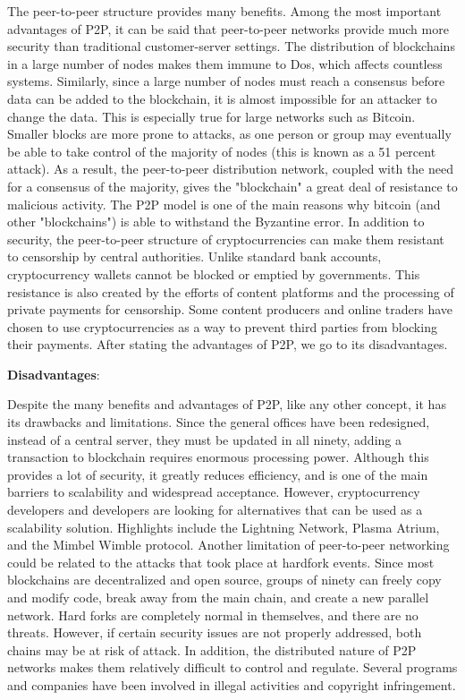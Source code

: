 The peer-to-peer structure provides many benefits. Among the most important advantages of P2P, it can be said that peer-to-peer networks provide much more security than traditional customer-server settings. The distribution of blockchains in a large number of nodes makes them immune to Dos, which affects countless systems.
Similarly, since a large number of nodes must reach a consensus before data can be added to the blockchain, it is almost impossible for an attacker to change the data. This is especially true for large networks such as Bitcoin. Smaller blocks are more prone to attacks, as one person or group may eventually be able to take control of the majority of nodes (this is known as a 51 percent attack).
As a result, the peer-to-peer distribution network, coupled with the need for a consensus of the majority, gives the "blockchain" a great deal of resistance to malicious activity. The P2P model is one of the main reasons why bitcoin (and other "blockchains") is able to withstand the Byzantine error.
In addition to security, the peer-to-peer structure of cryptocurrencies can make them resistant to censorship by central authorities. Unlike standard bank accounts, cryptocurrency wallets cannot be blocked or emptied by governments. This resistance is also created by the efforts of content platforms and the processing of private payments for censorship.
Some content producers and online traders have chosen to use cryptocurrencies as a way to prevent third parties from blocking their payments. After stating the advantages of P2P, we go to its disadvantages.\pagebreak

\textbf{Disadvantages}:

Despite the many benefits and advantages of P2P, like any other concept, it has its drawbacks and limitations.
Since the general offices have been redesigned, instead of a central server, they must be updated in all ninety, adding a transaction to blockchain requires enormous processing power. Although this provides a lot of security, it greatly reduces efficiency, and is one of the main barriers to scalability and widespread acceptance.
However, cryptocurrency developers and developers are looking for alternatives that can be used as a scalability solution. Highlights include the Lightning Network, Plasma Atrium, and the Mimbel Wimble protocol.
Another limitation of peer-to-peer networking could be related to the attacks that took place at hardfork events. Since most blockchains are decentralized and open source, groups of ninety can freely copy and modify code, break away from the main chain, and create a new parallel network. Hard forks are completely normal in themselves, and there are no threats. However, if certain security issues are not properly addressed, both chains may be at risk of attack.
In addition, the distributed nature of P2P networks makes them relatively difficult to control and regulate. Several programs and companies have been involved in illegal activities and copyright infringement.

